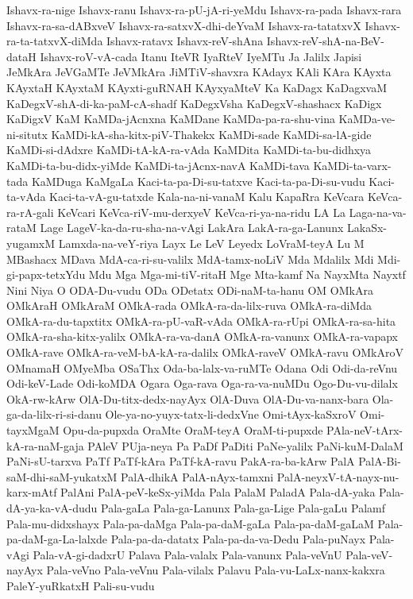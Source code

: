 {Ishavx-ra-nige
Ishavx-ranu
Ishavx-ra-pU-jA-ri-yeMdu
Ishavx-ra-pada
Ishavx-rara
Ishavx-ra-sa-dABxveV
Ishavx-ra-satxvX-dhi-deYvaM
Ishavx-ra-tatatxvX
Ishavx-ra-ta-tatxvX-diMda
Ishavx-ratavx
Ishavx-reV-shAna
Ishavx-reV-shA-na-BeV-dataH
Ishavx-roV-vA-cada
Itanu
IteVR
IyaRteV
IyeMTu
Ja
Jalilx
Japisi
JeMkAra
JeVGaMTe
JeVMkAra
JiMTiV-shavxra
KAdayx
KAli
KAra
KAyxta
KAyxtaH
KAyxtaM
KAyxti-guRNAH
KAyxyaMteV
Ka
KaDagx
KaDagxvaM
KaDegxV-shA-di-ka-paM-cA-shadf
KaDegxVsha
KaDegxV-shashacx
KaDigx
KaDigxV
KaM
KaMDa-jAcnxna
KaMDane
KaMDa-pa-ra-shu-vina
KaMDa-ve-ni-situtx
KaMDi-kA-sha-kitx-piV-Thakekx
KaMDi-sade
KaMDi-sa-lA-gide
KaMDi-si-dAdxre
KaMDi-tA-kA-ra-vAda
KaMDita
KaMDi-ta-bu-didhxya
KaMDi-ta-bu-didx-yiMde
KaMDi-ta-jAcnx-navA
KaMDi-tava
KaMDi-ta-varx-tada
KaMDuga
KaMgaLa
Kaci-ta-pa-Di-su-tatxve
Kaci-ta-pa-Di-su-vudu
Kaci-ta-vAda
Kaci-ta-vA-gu-tatxde
Kala-na-ni-vanaM
Kalu
KapaRra
KeVcara
KeVca-ra-rA-gali
KeVcari
KeVca-riV-mu-derxyeV
KeVca-ri-ya-na-ridu
LA
La
Laga-na-va-rataM
Lage
LageV-ka-da-ru-sha-na-vAgi
LakAra
LakA-ra-ga-Lanunx
LakaSx-yugamxM
Lamxda-na-veY-riya
Layx
Le
LeV
Leyedx
LoVraM-teyA
Lu
M
MBashacx
MDava
MdA-ca-ri-su-valilx
MdA-tamx-noLiV
Mda
Mdalilx
Mdi
Mdi-gi-papx-tetxYdu
Mdu
Mga
Mga-mi-tiV-ritaH
Mge
Mta-kamf
Na
NayxMta
Nayxtf
Nini
Niya
O
ODA-Du-vudu
ODa
ODetatx
ODi-naM-ta-hanu
OM
OMkAra
OMkAraH
OMkAraM
OMkA-rada
OMkA-ra-da-lilx-ruva
OMkA-ra-diMda
OMkA-ra-du-tapxtitx
OMkA-ra-pU-vaR-vAda
OMkA-ra-rUpi
OMkA-ra-sa-hita
OMkA-ra-sha-kitx-yalilx
OMkA-ra-va-danA
OMkA-ra-vanunx
OMkA-ra-vapapx
OMkA-rave
OMkA-ra-veM-bA-kA-ra-dalilx
OMkA-raveV
OMkA-ravu
OMkAroV
OMnamaH
OMyeMba
OSaThx
Oda-ba-lalx-va-ruMTe
Odana
Odi
Odi-da-reVnu
Odi-keV-Lade
Odi-koMDA
Ogara
Oga-rava
Oga-ra-va-nuMDu
Ogo-Du-vu-dilalx
OkA-rw-kArw
OlA-Du-titx-dedx-nayAyx
OlA-Duva
OlA-Du-va-nanx-bara
Ola-ga-da-lilx-ri-si-danu
Ole-ya-no-yuyx-tatx-li-dedxVne
Omi-tAyx-kaSxroV
Omi-tayxMgaM
Opu-da-pupxda
OraMte
OraM-teyA
OraM-ti-pupxde
PAla-neV-tArx-kA-ra-naM-gaja
PAleV
PUja-neya
Pa
PaDf
PaDiti
PaNe-yalilx
PaNi-kuM-DalaM
PaNi-sU-tarxva
PaTf
PaTf-kAra
PaTf-kA-ravu
PakA-ra-ba-kArw
PalA
PalA-Bi-saM-dhi-saM-yukatxM
PalA-dhikA
PalA-nAyx-tamxni
PalA-neyxV-tA-nayx-nu-karx-mAtf
PalAni
PalA-peV-keSx-yiMda
Pala
PalaM
PaladA
Pala-dA-yaka
Pala-dA-ya-ka-vA-dudu
Pala-gaLa
Pala-ga-Lanunx
Pala-ga-Lige
Pala-gaLu
Palamf
Pala-mu-didxshayx
Pala-pa-daMga
Pala-pa-daM-gaLa
Pala-pa-daM-gaLaM
Pala-pa-daM-ga-La-lalxde
Pala-pa-da-datatx
Pala-pa-da-va-Dedu
Pala-puNayx
Pala-vAgi
Pala-vA-gi-dadxrU
Palava
Pala-valalx
Pala-vanunx
Pala-veVnU
Pala-veV-nayAyx
Pala-veVno
Pala-veVnu
Pala-vilalx
Palavu
Pala-vu-LaLx-nanx-kakxra
PaleY-yuRkatxH
Pali-su-vudu
}
